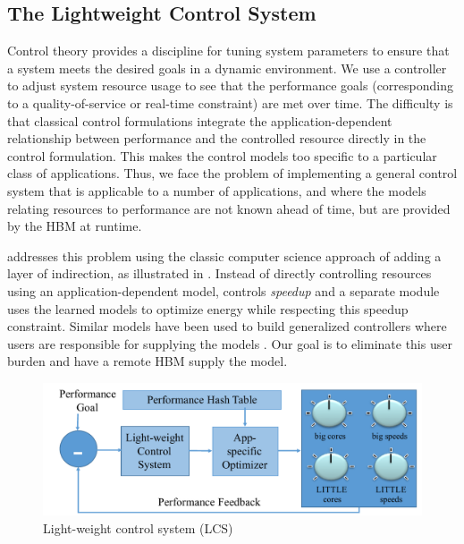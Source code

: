 \subsection{The Lightweight Control System}

Control theory provides a discipline for tuning system parameters to
ensure that a system meets the desired goals in a dynamic environment.
We use a controller to adjust system resource usage to see that the
performance goals (corresponding to a quality-of-service or real-time
constraint) are met over time.  The difficulty is that classical
control formulations integrate the application-dependent relationship
between performance and the controlled resource directly in the
control formulation. This makes the control models too specific to a
particular class of applications.  Thus, we face the problem of
implementing a general control system that is applicable to a number
of applications, and where the models relating resources to
performance are not known ahead of time, but are provided by the HBM
at runtime.

\SYSTEM{} addresses this problem using the classic computer science
approach of adding a layer of indirection, as illustrated in
.  Instead of directly controlling resources
using an application-dependent model, \SYSTEM{} controls
\emph{speedup} and a separate module uses the learned models to
optimize energy while respecting this speedup constraint.  Similar
models have been used to build generalized controllers where users are
responsible for supplying the models \cite{ControlWare,POET}.  Our
goal is to eliminate this user burden and have a remote HBM supply the
model.

\begin{figure}
\includegraphics[width=\columnwidth]{figures/LCS.pdf}
\caption{Light-weight control system (LCS) }
  \label{fig:framework:lcs}
\end{figure}


